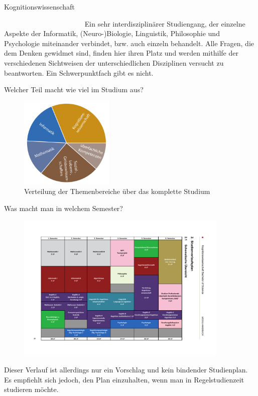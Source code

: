 	\begin{Huge}
			Kognitionswissenschaft
		\end{Huge}
		\begin{exampleblock}{\textcolor{white}{Was ist der Studiengang?}}
			Ein sehr interdisziplinärer Studiengang, der einzelne Aspekte der Informatik, (Neuro-)Biologie, Linguistik, Philosophie und Psychologie miteinander verbindet, bzw. auch einzeln behandelt. Alle Fragen, die dem Denken gewidmet sind, finden hier ihren Platz und werden mithilfe der verschiedenen Sichtweisen der unterschiedlichen Disziplinen versucht zu beantworten. Ein Schwerpunktfach gibt es nicht.
		\end{exampleblock}
	
	\begin{block}{Welcher Teil macht wie viel im Studium aus?}
		\begin{figure}[h!]
			\includegraphics[width=0.4\textwidth]{charts/kogni-Piechart.pdf}
			\caption{Verteilung der Themenbereiche über das komplette Studium}
		\end{figure}
	\end{block}
	
	\begin{block}{Was macht man in welchem Semester?}
		\begin{figure}[h!]
			\includegraphics[width=0.9\textwidth,trim=60 60 140 70, clip,]{charts/KogWis_Studienverlaufsplan.pdf}
		\end{figure}
		Dieser Verlauf ist allerdings nur ein Vorschlag und kein bindender Studienplan. Es empfiehlt sich jedoch, den Plan einzuhalten, wenn man in Regelstudienzeit studieren möchte.
	\end{block}

